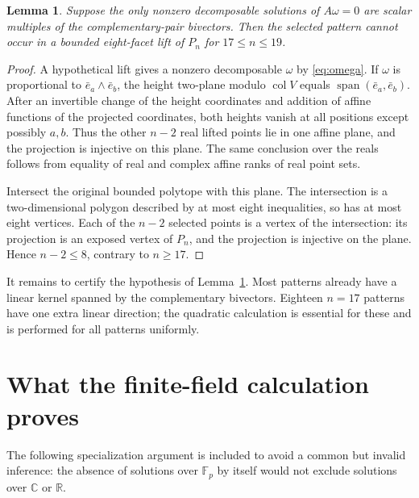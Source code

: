 \documentclass[11pt]{article}
\newtheorem{lemma}[theorem]{Lemma}
\theoremstyle{definition}
\newcommand{\Span}{\operatorname{span}}
\newcommand{\R}{\mathbb R}
\newcommand{\C}{\mathbb C}
\newcommand{\Fp}{\mathbb F_p}
\begin{document}
\begin{lemma}\label{lem:plane}
Suppose the only nonzero decomposable solutions of $A\omega=0$ are scalar multiples of the complementary-pair bivectors. Then the selected pattern cannot occur in a bounded eight-facet lift of $P_n$ for $17\le n\le19$.
\end{lemma}
\begin{proof}
A hypothetical lift gives a nonzero decomposable $\omega$ by \eqref{eq:omega}. If $\omega$ is proportional to $\bar e_a\wedge\bar e_b$, the height two-plane modulo $\operatorname{col}V$ equals $\Span(\bar e_a,\bar e_b)$. After an invertible change of the height coordinates and addition of affine functions of the projected coordinates, both heights vanish at all positions except possibly $a,b$. Thus the other $n-2$ real lifted points lie in one affine plane, and the projection is injective on this plane. The same conclusion over the reals follows from equality of real and complex affine ranks of real point sets.

Intersect the original bounded polytope with this plane. The intersection is a two-dimensional polygon described by at most eight inequalities, so has at most eight vertices. Each of the $n-2$ selected points is a vertex of the intersection: its projection is an exposed vertex of $P_n$, and the projection is injective on the plane. Hence $n-2\le8$, contrary to $n\ge17$.
\end{proof}

It remains to certify the hypothesis of Lemma~\ref{lem:plane}. Most patterns already have a linear kernel spanned by the complementary bivectors. Eighteen $n=17$ patterns have one extra linear direction; the quadratic calculation is essential for these and is performed for all patterns uniformly.

\section{What the finite-field calculation proves}
The following specialization argument is included to avoid a common but invalid inference: the absence of solutions over $\Fp$ by itself would not exclude solutions over $\C$ or $\R$.
\end{document}

